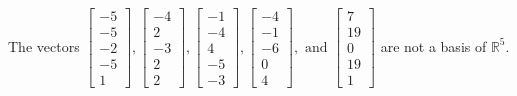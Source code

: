 \begin{exercise}
\begin{exerciseStatement}
  \end{exerciseStatement}
  \begin{exerciseAnswer}
   The vectors \(\left[\begin{array}{r}
-5 \\
-5 \\
-2 \\
-5 \\
1
\end{array}\right] , \left[\begin{array}{r}
-4 \\
2 \\
-3 \\
2 \\
2
\end{array}\right] , \left[\begin{array}{r}
-1 \\
-4 \\
4 \\
-5 \\
-3
\end{array}\right] , \left[\begin{array}{r}
-4 \\
-1 \\
-6 \\
0 \\
4
\end{array}\right] , \text{ and } \left[\begin{array}{r}
7 \\
19 \\
0 \\
19 \\
1
\end{array}\right]\) 
  	 are not  a basis of \(\mathbb{R}^5\).
  


  \end{exerciseAnswer}
\end{exercise}